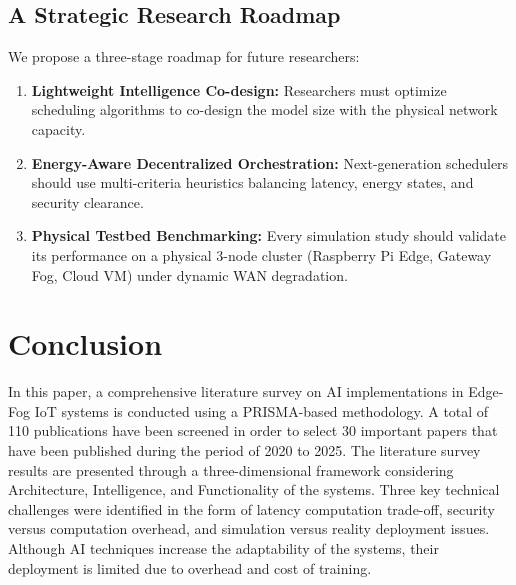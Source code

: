 \documentclass[conference]{IEEEtran}
\begin{document}
\subsection{A Strategic Research Roadmap}
We propose a three-stage roadmap for future researchers:
\begin{enumerate}
    \item \textbf{Lightweight Intelligence Co-design:} Researchers must optimize scheduling algorithms to co-design the model size with the physical network capacity.
    \item \textbf{Energy-Aware Decentralized Orchestration:} Next-generation schedulers should use multi-criteria heuristics balancing latency, energy states, and security clearance.
    \item \textbf{Physical Testbed Benchmarking:} Every simulation study should validate its performance on a physical 3-node cluster (Raspberry Pi Edge, Gateway Fog, Cloud VM) under dynamic WAN degradation.
\end{enumerate}

\section{Conclusion}
\label{sec:conclusion}

In this paper, a comprehensive literature survey on AI implementations in Edge-Fog IoT systems is conducted using a PRISMA-based methodology. A total of 110 publications have been screened in order to select 30 important papers that have been published during the period of 2020 to 2025. The literature survey results are presented through a three-dimensional framework considering Architecture, Intelligence, and Functionality of the systems. Three key technical challenges were identified in the form of latency computation trade-off, security versus computation overhead, and simulation versus reality deployment issues. Although AI techniques increase the adaptability of the systems, their deployment is limited due to overhead and cost of training.
\end{document}
